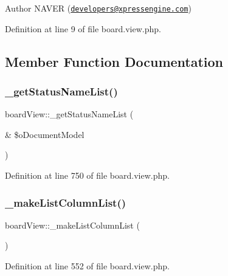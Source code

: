 \begin{DoxyAuthor}{Author}
N\+A\+V\+ER (\href{mailto:developers@xpressengine.com}{\tt developers@xpressengine.\+com}) 
\end{DoxyAuthor}


Definition at line 9 of file board.\+view.\+php.



\subsection{Member Function Documentation}
\hypertarget{classboardView_a271618817f43707fea90ba411cad06c0}{}\label{classboardView_a271618817f43707fea90ba411cad06c0} 
\subsubsection{\texorpdfstring{\+\_\+get\+Status\+Name\+List()}{\_getStatusNameList()}}
{\footnotesize\ttfamily board\+View\+::\+\_\+get\+Status\+Name\+List (\begin{DoxyParamCaption}\item[{\&}]{\$o\+Document\+Model }\end{DoxyParamCaption})}



Definition at line 750 of file board.\+view.\+php.

\hypertarget{classboardView_a9ceb0843ce6b0a30fb82deac87a40a22}{}\label{classboardView_a9ceb0843ce6b0a30fb82deac87a40a22} 
\subsubsection{\texorpdfstring{\+\_\+make\+List\+Column\+List()}{\_makeListColumnList()}}
{\footnotesize\ttfamily board\+View\+::\+\_\+make\+List\+Column\+List (\begin{DoxyParamCaption}{ }\end{DoxyParamCaption})}



Definition at line 552 of file board.\+view.\+php.

\hypertarget{classboardView_a421e95c8dd73767264da56ca4d1e360d}{}\label{classboardView_a421e95c8dd73767264da56ca4d1e360d} 
